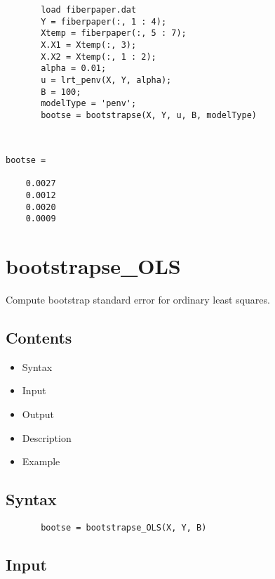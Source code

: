 \documentclass[a4paper,11pt,openany]{memoir}
\begin{document}
\begin{verbatim}       load fiberpaper.dat
       Y = fiberpaper(:, 1 : 4);
       Xtemp = fiberpaper(:, 5 : 7);
       X.X1 = Xtemp(:, 3);
       X.X2 = Xtemp(:, 1 : 2);
       alpha = 0.01;
       u = lrt_penv(X, Y, alpha);
       B = 100;
       modelType = 'penv';
       bootse = bootstrapse(X, Y, u, B, modelType)\end{verbatim}
    

        \color{lightgray}\ttfamily \begin{verbatim}


bootse =

    0.0027
    0.0012
    0.0020
    0.0009

\end{verbatim} \rmfamily
\color{black}
    

\newpage

\rmfamily
\color{black}\section{bootstrapse\_OLS}

\begin{par}
Compute bootstrap standard error for ordinary least squares.
\end{par} \vspace{1em}

\subsection*{Contents}

\begin{itemize}
\setlength{\itemsep}{-1ex}
   \item Syntax
   \item Input
   \item Output
   \item Description
   \item Example
\end{itemize}


\subsection*{Syntax}


\begin{verbatim}       bootse = bootstrapse_OLS(X, Y, B)\end{verbatim}
    

\subsection*{Input}
\end{document}
